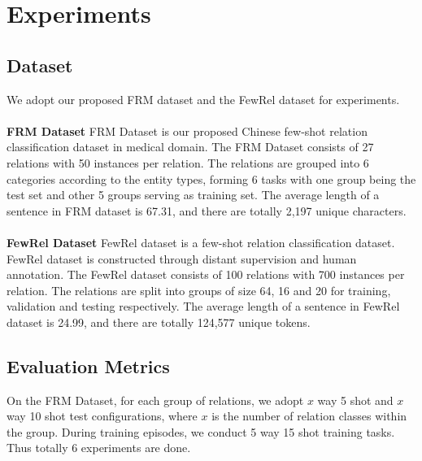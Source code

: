 \section{Experiments}
\subsection{Dataset}
We adopt our proposed FRM dataset and the FewRel dataset \citep{han-etal-2018-fewrel} for experiments.
~\\
~\\
\textbf{FRM Dataset} FRM Dataset is our proposed Chinese few-shot relation classification dataset in medical domain. The FRM Dataset consists of 27 relations with 50 instances per relation. The relations are grouped into 6 categories according to the entity types, forming 6 tasks with one group being the test set and other 5 groups serving as training set. The average length of a sentence in FRM dataset is 67.31, and there are totally 2,197 unique characters.
~\\
~\\
\textbf{FewRel Dataset} FewRel dataset \citep{han-etal-2018-fewrel} is a few-shot relation classification dataset. FewRel dataset is constructed through distant supervision and human annotation. The FewRel dataset consists of 100 relations with 700 instances per relation. The relations are split into groups of size 64, 16 and 20 for training, validation and testing respectively. The average length of a sentence in FewRel dataset is 24.99, and there are totally 124,577 unique tokens.

\subsection{Evaluation Metrics}
On the FRM Dataset, for each group of relations, we adopt $x$ way 5 shot and $x$ way 10 shot test configurations, where $x$ is the number of relation classes within the group. During training episodes, we conduct 5 way 15 shot training tasks. Thus totally 6 experiments are done. 


